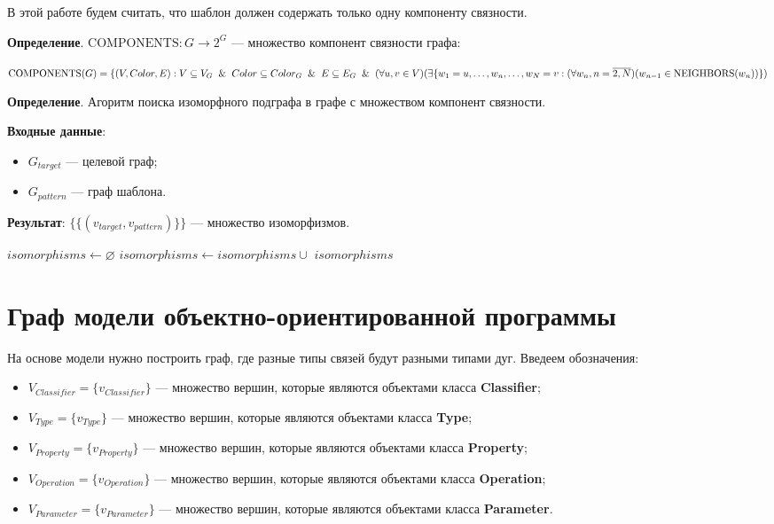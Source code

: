 В этой работе будем считать, что шаблон должен содержать только одну
компоненту связности.

\textbf{Определение}. $\textrm{COMPONENTS} : G \to 2^G$ --- множество компонент
связности графа:

$\textrm{COMPONENTS}(G) = \{ (V, Color, E) : V \subseteq V_G \And Color \subseteq Color_G \And E \subseteq E_G \And (\forall u, v \in V)(\exists \{ w_1 = u, \dots, w_n, \dots, w_N = v : (\forall w_n, n=\overline{2,N})(w_{n-1} \in \textrm{NEIGHBORS}(w_n)) \})$

\textbf{Определение}. Агоритм поиска изоморфного подграфа в графе с множеством
компонент связности.

\textbf{Входные данные}:
\begin{itemize}
\item $G_{target}$ --- целевой граф;
\item $G_{pattern}$ --- граф шаблона.
\end{itemize}

\textbf{Результат}: $\{ \{ ( v_{target}, v_{pattern} ) \} \}$ --- множество
изоморфизмов.

\begin{algorithmic}
    \State $isomorphisms \gets \varnothing$
        \State $isomorphisms \gets isomorphisms \cup$ 
    \EndFor
    \State \Return $isomorphisms$
\EndFunction
\end{algorithmic}

\section{Граф модели объектно-ориентированной программы}

На основе модели нужно построить граф, где разные типы связей будут разными типами дуг.
Введеем обозначения:
\begin{itemize}
\item $V_{Classifier} = \{ v_{Classifier} \}$ --- множество вершин, которые являются объектами класса \textbf{Classifier};
\item $V_{Type} = \{ v_{Type} \}$ --- множество вершин, которые являются объектами класса \textbf{Type};
\item $V_{Property} = \{ v_{Property} \}$ --- множество вершин, которые являются объектами класса \textbf{Property};
\item $V_{Operation} = \{ v_{Operation} \}$ --- множество вершин, которые являются объектами класса \textbf{Operation};
\item $V_{Parameter} = \{ v_{Parameter} \}$ --- множество вершин, которые являются объектами класса \textbf{Parameter}.
\end{itemize}

